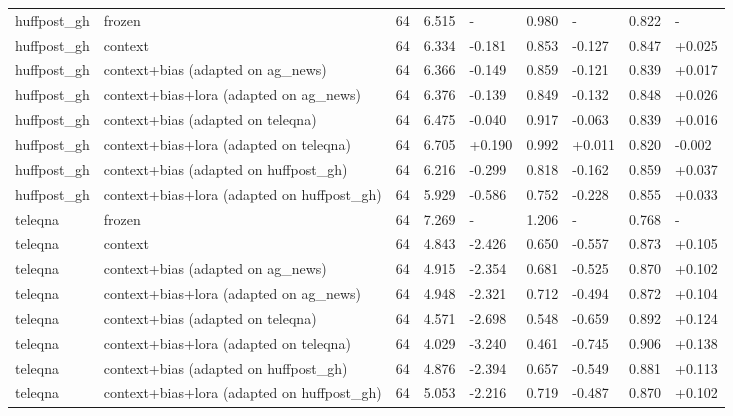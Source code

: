 \begin{tabular}{lllllllll}
huffpost\_gh & frozen & 64 & 6.515 & - & 0.980 & - & 0.822 & - \\
huffpost\_gh & context & 64 & 6.334 & -0.181 & 0.853 & -0.127 & 0.847 & +0.025 \\
huffpost\_gh & context+bias (adapted on ag\_news) & 64 & 6.366 & -0.149 & 0.859 & -0.121 & 0.839 & +0.017 \\
huffpost\_gh & context+bias+lora (adapted on ag\_news) & 64 & 6.376 & -0.139 & 0.849 & -0.132 & 0.848 & +0.026 \\
huffpost\_gh & context+bias (adapted on teleqna) & 64 & 6.475 & -0.040 & 0.917 & -0.063 & 0.839 & +0.016 \\
huffpost\_gh & context+bias+lora (adapted on teleqna) & 64 & 6.705 & +0.190 & 0.992 & +0.011 & 0.820 & -0.002 \\
huffpost\_gh & context+bias (adapted on huffpost\_gh) & 64 & 6.216 & -0.299 & 0.818 & -0.162 & 0.859 & +0.037 \\
huffpost\_gh & context+bias+lora (adapted on huffpost\_gh) & 64 & 5.929 & -0.586 & 0.752 & -0.228 & 0.855 & +0.033 \\
teleqna & frozen & 64 & 7.269 & - & 1.206 & - & 0.768 & - \\
teleqna & context & 64 & 4.843 & -2.426 & 0.650 & -0.557 & 0.873 & +0.105 \\
teleqna & context+bias (adapted on ag\_news) & 64 & 4.915 & -2.354 & 0.681 & -0.525 & 0.870 & +0.102 \\
teleqna & context+bias+lora (adapted on ag\_news) & 64 & 4.948 & -2.321 & 0.712 & -0.494 & 0.872 & +0.104 \\
teleqna & context+bias (adapted on teleqna) & 64 & 4.571 & -2.698 & 0.548 & -0.659 & 0.892 & +0.124 \\
teleqna & context+bias+lora (adapted on teleqna) & 64 & 4.029 & -3.240 & 0.461 & -0.745 & 0.906 & +0.138 \\
teleqna & context+bias (adapted on huffpost\_gh) & 64 & 4.876 & -2.394 & 0.657 & -0.549 & 0.881 & +0.113 \\
teleqna & context+bias+lora (adapted on huffpost\_gh) & 64 & 5.053 & -2.216 & 0.719 & -0.487 & 0.870 & +0.102 \\
\hline
\end{tabular}
